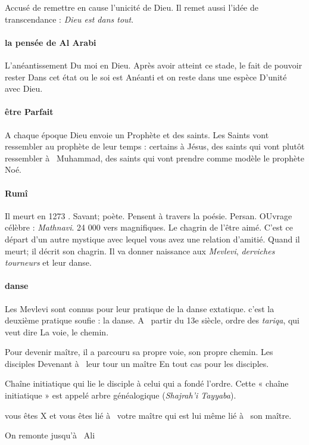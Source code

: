  
Accusé de remettre en cause 
 l'unicité de Dieu. Il remet aussi l'idée de transcendance : \textit{Dieu est dans tout}. 

\paragraph{la pensée de Al Arabi} 

 
L'anéantissement 
Du moi en Dieu. 
Après avoir atteint ce stade,  le fait de pouvoir rester Dans cet état ou le soi est 
Anéanti et on reste dans une espèce 
D'unité avec Dieu.

\paragraph{être 
Parfait } A chaque époque Dieu envoie un Prophète et des saints. Les Saints vont ressembler au prophète de leur temps : certains à Jésus, des saints qui  vont plutôt ressembler à  Muhammad, des saints qui  vont prendre comme modèle le prophète 
Noé.



\paragraph{Rumî } Il meurt en 1273 . Savant; poète. Pensent 
à travers la poésie. Persan. OUvrage célèbre : \textit{Mathnavi}. 24 000 vers magnifiques. Le chagrin de l'être aimé. 
C'est ce départ d'un autre mystique 
avec lequel vous avez une relation d'amitié. Quand il meurt; il décrit son 
chagrin.  Il va donner naissance aux \textit{Mevlevi}, \textit{derviches tourneurs} et leur danse.
\paragraph{danse}
Les Mevlevi sont connus pour leur pratique de la danse extatique. 
  c'est la deuxième  pratique soufie : la danse.
 A  partir du 13e siècle, ordre des  \textit{tariqa}, qui  veut dire 
La voie, le chemin.

Pour devenir maître, il a parcouru sa propre voie, son propre chemin.
Les disciples 
Devenant à  leur tour un maître 
En tout cas pour les disciples.  

\begin{Def}[silsila]
    Chaîne initiatique qui lie le disciple à celui qui a fondé l'ordre.
    Cette « chaîne initiatique »  est appelé arbre généalogique (\emph{Shajrah'i Tayyaba}).
\end{Def}
\begin{Ex}
    vous êtes 
X et vous êtes lié à  votre maître qui  est lui même lié à  
son maître.
 
On remonte jusqu'à  
Ali 
\end{Ex}



